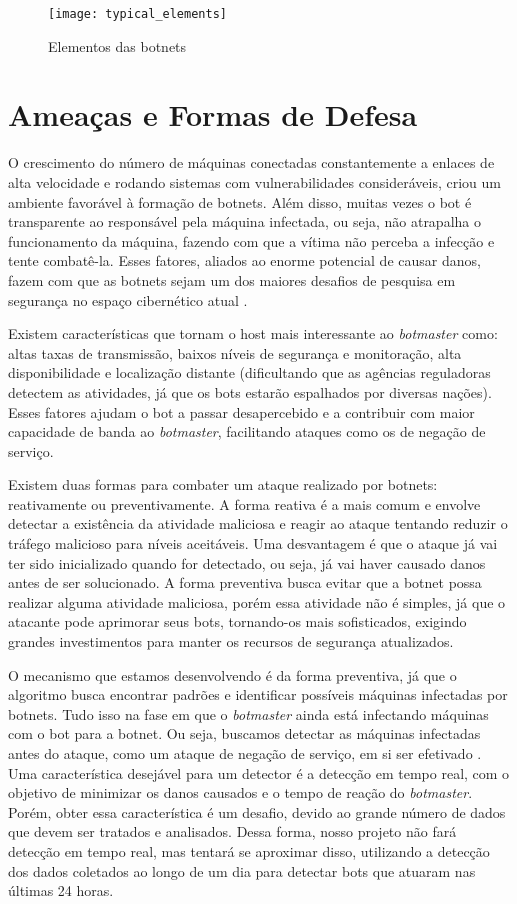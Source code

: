 \begin{figure}
\texttt{[image: typical\_elements]}
\caption[Elementos das botnets]{Elementos das botnets \citep{silva2013botnets}} \label{fig:typical_elements}
\end{figure}

\section{Ameaças e Formas de Defesa}
O crescimento do número de máquinas conectadas constantemente a enlaces de alta velocidade e rodando sistemas com vulnerabilidades consideráveis, criou um ambiente favorável à formação de botnets. Além disso, muitas vezes o bot é transparente ao responsável pela máquina infectada, ou seja, não atrapalha o funcionamento da máquina, fazendo com que a vítima não perceba a infecção e tente combatê-la. Esses fatores, aliados ao enorme potencial de causar danos, fazem com que as botnets sejam um dos maiores desafios de pesquisa em segurança no espaço cibernético atual \citep{soltani2014survey}.

Existem características que tornam o host mais interessante ao \textit{botmaster} como: altas taxas de transmissão, baixos níveis de segurança e monitoração, alta disponibilidade e localização distante (dificultando que as agências reguladoras detectem as atividades, já que os bots estarão espalhados por diversas nações). Esses fatores ajudam o bot a passar desapercebido e a contribuir com maior capacidade de banda ao \textit{botmaster}, facilitando ataques como os de negação de serviço.

Existem duas formas para combater um ataque realizado por botnets: reativamente ou preventivamente. A forma reativa é a mais comum e envolve detectar a existência da atividade maliciosa e reagir ao ataque tentando reduzir o tráfego malicioso para níveis aceitáveis. Uma desvantagem é que o ataque já vai ter sido inicializado quando for detectado, ou seja, já vai haver causado danos antes de ser solucionado. A forma preventiva busca evitar que a botnet possa realizar alguma atividade maliciosa, porém essa atividade não é simples, já que o atacante pode aprimorar seus bots, tornando-os mais sofisticados, exigindo grandes investimentos para manter os recursos de segurança atualizados.

O mecanismo que estamos desenvolvendo é da forma preventiva, já que o algoritmo busca encontrar padrões e identificar possíveis máquinas infectadas por botnets. Tudo isso na fase em que o \textit{botmaster} ainda está infectando máquinas com o bot para a botnet. Ou seja, buscamos detectar as máquinas infectadas antes do ataque, como um ataque de negação de serviço, em si ser efetivado
. Uma característica desejável para um detector é a detecção em tempo real, com o objetivo de minimizar os danos causados e o tempo de reação do \textit{botmaster}. Porém, obter essa característica é um desafio, devido ao grande número de dados que devem ser tratados e analisados. Dessa forma, nosso projeto não fará detecção em tempo real, mas tentará se aproximar disso, utilizando a detecção dos dados coletados ao longo de um dia para detectar bots que atuaram nas últimas 24 horas.

